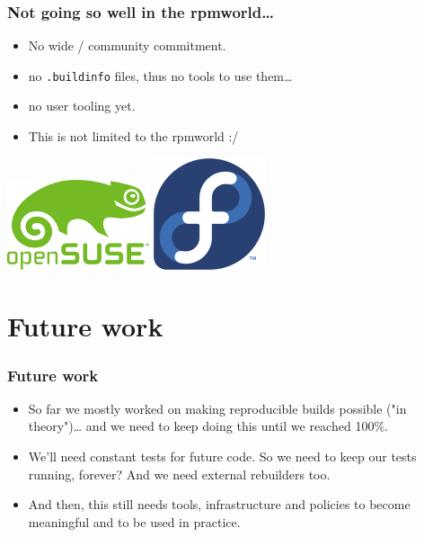 \documentclass[14pt,aspectratio=169]{beamer}
\begin{document}
\begin{frame}
 \frametitle{Not going so well in the rpmworld…}
 \begin{itemize}
	 \item No wide / community commitment.
	 \item<2-3> no \texttt{.buildinfo} files, thus no tools to use them…
	 \item<2-3> no user tooling yet.	 
	\item<3> This is not limited to the rpmworld :/
  \end{itemize}
 \begin{center}
  \includegraphics[height=0.1\paperheight]{images/openSUSE.png}
  \hspace{0.1\paperwidth}
 \includegraphics[height=0.1\paperheight]{images/fedora.png}
  \hspace{0.1\paperwidth}
 \end{center}

\end{frame}





\section{Future work}

\begin{frame}
 \frametitle{Future work}
 \begin{itemize}
	 \item<1-3> So far we mostly worked on making reproducible builds possible ("in theory")… and we need to keep doing this until we reached 100\%.
 \item<2-3> We'll need constant tests for future code. So we need to keep our tests running, forever? And we need external rebuilders too.

 \item<3> And then, this still needs tools, infrastructure and policies to become
 meaningful and to be used in practice.
 \end{itemize}
\end{frame}
\end{document}
